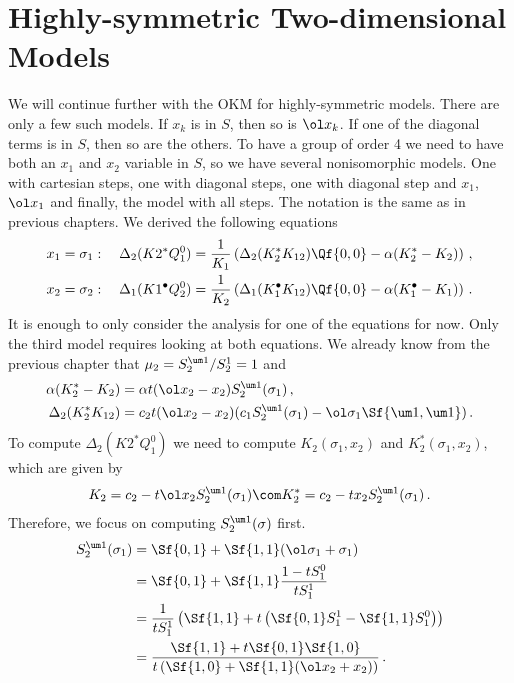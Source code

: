 
\chapter{Highly-symmetric Two-dimensional Models}
\label{ch:HighSym}
We will continue further with the OKM for highly-symmetric models. There are only a few such models. If $x_k$ is in $S$, then so is $\ol x_k$. If one of the diagonal terms is in $S$, then so are the others. To have a group of order 4 we need to have both an $x_1$ and $x_2$ variable in $S$, so we have several nonisomorphic models. One with cartesian steps, one with diagonal steps, one with diagonal step and $x_1$,$\ol x_1$ and finally, the model with all steps. The notation is the same as in previous chapters. We derived the following equations
\begin{align}
	x_1 = \sigma_1:\quad\Delta_2(K2^\ast Q_1^0) &=\frac{1}{K_1} \left(\Delta_2(K_2^\ast K_{12})\Qf{0,0} - \alpha(K_2^\ast-K_2)\right)\,,\\
	x_2 = \sigma_2:\quad\Delta_1(K1^\bullet Q_2^0) &=\frac{1}{K_2} \left(\Delta_1(K_1^\bullet K_{12})\Qf{0,0} - \alpha(K_1^\bullet-K_1)\right)\,.
\end{align}
It is enough to only consider the analysis for one of the equations for now. Only the third model requires looking at both equations. We already know from the previous chapter that $\mu_2 = S_2^{\um 1}/S_2^1 = 1$ and 
\begin{align}
	\alpha(K_2^\ast -K_2)  &= \alpha t(\ol x_2 - x_2)S_2^{\um 1}(\sigma_1)\,,\\
	\Delta_2(K_2^\ast K_{12}) &= c_2t(\ol x_2-x_2)(c_1S_2^{\um 1}(\sigma_1) - \ol \sigma_1\Sf{\um 1,\um 1})\,.
\end{align}
To compute $\Delta_2(K2^\ast Q_1^0)$ we need to compute $K_2(\sigma_1,x_2)$ and $K_2^\ast(\sigma_1,x_2)$, which are given by
\begin{align}
	K_2 = c_2 -t\ol x_2S_2^{\um 1}(\sigma_1) \com K_2^\ast = c_2 -t x_2S_2^{\um 1}(\sigma_1)\,.
\end{align}
Therefore, we focus on computing $S_2^{\um 1}(\sigma)$ first.
\begin{align}
\begin{split}
	S_2^{\um 1}(\sigma_1) &= \Sf{0,1}+ \Sf{1,1}(\ol \sigma_1+\sigma_1)\\
	&= \Sf{0,1} + \Sf{1,1}\frac{1-tS_1^0}{t S_1^1}\\
	&= \frac{1}{tS_1^1}\left(\Sf{1,1}+t\left(\Sf{0,1}S_1^1-\Sf{1,1}S_1^0\right)\right)\\
	&= \frac{\Sf{1,1}+t\Sf{0,1}\Sf{1,0}}{t\left(\Sf{1,0}+\Sf{1,1}(\ol x_2+x_2)\right)}\,.
\end{split}
\end{align}
